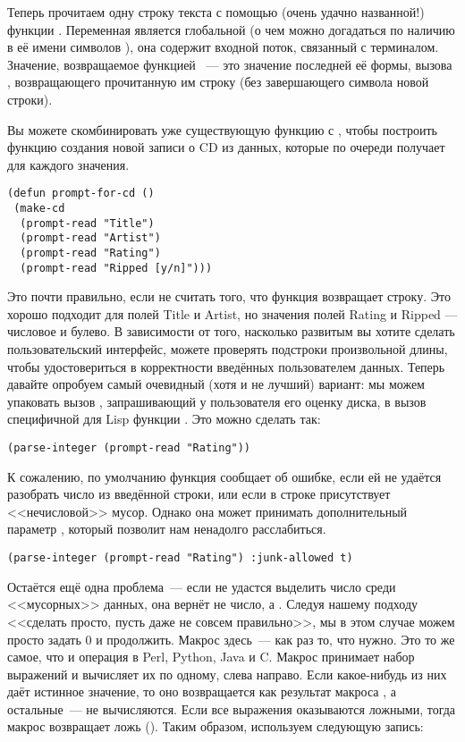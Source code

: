 Теперь прочитаем одну строку текста с помощью (очень удачно названной!) функции
. Переменная  является глобальной (о чем можно
догадаться по наличию в её имени символов \code{*}), она содержит входной поток, связанный
с терминалом. Значение, возвращаемое функцией ~--- это значение
последней её формы, вызова , возвращающего прочитанную им строку (без
завершающего символа новой строки).

Вы можете скомбинировать уже существующую функцию  с ,
чтобы построить функцию создания новой записи о CD из данных, которые  по
очереди получает для каждого значения.

\begin{lstlisting}
(defun prompt-for-cd ()
 (make-cd
  (prompt-read "Title")
  (prompt-read "Artist")
  (prompt-read "Rating")
  (prompt-read "Ripped [y/n]")))
\end{lstlisting}

Это почти правильно, если не считать того, что функция  возвращает
строку. Это хорошо подходит для полей Title и Artist, но значения полей Rating и Ripped
--- числовое и булево. В зависимости от того, насколько развитым вы хотите сделать
пользовательский интерфейс, можете проверять подстроки произвольной длины, чтобы
удостовериться в корректности введённых пользователем данных. Теперь давайте опробуем
самый очевидный (хотя и не лучший) вариант: мы можем упаковать вызов ,
запрашивающий у пользователя его оценку диска, в вызов специфичной для Lisp функции
. Это можно сделать так:

\begin{lstlisting}
(parse-integer (prompt-read "Rating"))
\end{lstlisting}

К сожалению, по умолчанию функция  сообщает об ошибке, если ей не
удаётся разобрать число из введённой строки, или если в строке присутствует <<нечисловой>>
мусор. Однако она может принимать дополнительный параметр , который позволит
нам ненадолго расслабиться.

\begin{lstlisting}
(parse-integer (prompt-read "Rating") :junk-allowed t)
\end{lstlisting}

Остаётся ещё одна проблема~--- если  не удастся выделить число среди
<<мусорных>> данных, она вернёт не число, а . Следуя нашему подходу <<сделать
просто, пусть даже не совсем правильно>>, мы в этом случае можем просто задать 0 и
продолжить. Макрос  здесь~--- как раз то, что нужно. Это то же самое, что и
операция \code{||} в Perl, Python, Java и C. Макрос принимает набор выражений и
вычисляет их по одному, слева направо. Если какое-нибудь из них даёт истинное значение, то
оно возвращается как результат макроса , а остальные~--- не вычисляются. Если
все выражения оказываются ложными, тогда макрос  возвращает ложь
(). Таким образом, используем следующую запись:

